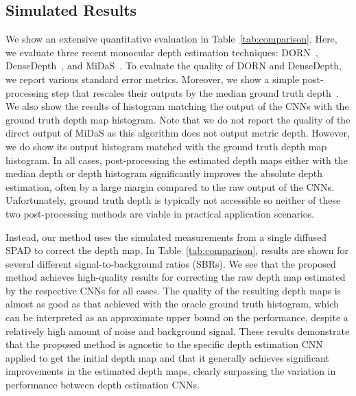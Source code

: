 
\subsection{Simulated Results}

We show an extensive quantitative evaluation in Table~\ref{tab:comparison}. Here, we evaluate three recent monocular depth estimation techniques: DORN~\cite{Fu2018}, DenseDepth~\cite{Alhashim2018}, and MiDaS~\cite{Lasinger:2019}. To evaluate the quality of DORN and DenseDepth, we report various standard error metrics. Moreover, we show a simple post-processing step that rescales their outputs by the median ground truth depth~\cite{Alhashim2018}. We also show the results of histogram matching the output of the CNNs with the ground truth depth map histogram. Note that we do not report the quality of the direct output of MiDaS as this algorithm does not output metric depth. However, we do show its output histogram matched with the ground truth depth map histogram. In all cases, post-processing the estimated depth maps either with the median depth or depth histogram significantly improves the absolute depth estimation, often by a large margin compared to the raw output of the CNNs. Unfortunately, ground truth depth is typically not accessible so neither of these two post-processing methods are viable in practical application scenarios. 

Instead, our method uses the simulated measurements from a single diffused SPAD
to correct the depth map. In Table~\ref{tab:comparison}, results are shown for several different
signal-to-background ratios (SBRs). We see that the proposed method achieves
high-quality results for correcting the raw depth map estimated by the
respective CNNs for all cases. The quality of the resulting depth maps is almost
as good as that achieved with the oracle ground truth histogram, which can be
interpreted as an approximate upper bound on the performance, despite a
relatively high amount of noise and background signal. These results demonstrate
that the proposed method is agnostic to the specific depth estimation CNN
applied to get the initial depth map and that it generally achieves significant
improvements in the estimated depth maps, clearly surpassing the variation in
performance between depth estimation CNNs.


